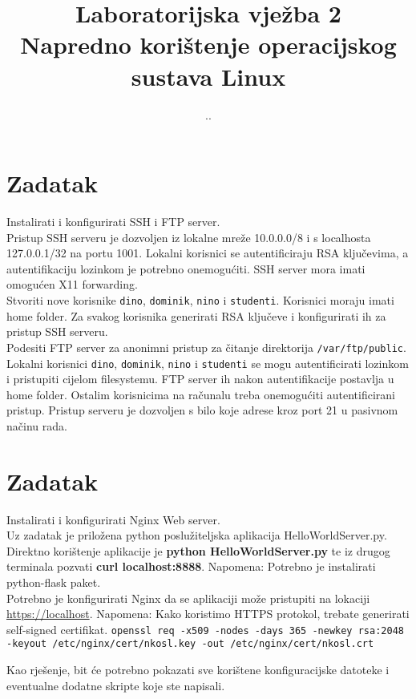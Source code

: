 \documentclass[12pt,a4paper]{article}
\renewcommand{\dateseparator}{.}
\newcommand{\todayiso}{\twodigit\day \dateseparator \twodigit\month \dateseparator \the \year}
\begin{document}
    \title{Laboratorijska vježba 2\\{\large Napredno korištenje operacijskog sustava Linux}}
    \date{\todayiso}
	\date{\vspace{-5ex} }
	\maketitle
	

\section{Zadatak}

Instalirati i konfigurirati SSH i FTP server.\\

Pristup SSH serveru je dozvoljen iz lokalne mreže 10.0.0.0/8 i s localhosta 127.0.0.1/32 na portu 1001. Lokalni korisnici se autentificiraju RSA ključevima, a autentifikaciju lozinkom je potrebno onemogućiti. SSH server mora imati omogućen X11 forwarding.\\
Stvoriti nove korisnike \texttt{dino}, \texttt{dominik}, \texttt{nino} i \texttt{studenti}. Korisnici moraju imati home folder. Za svakog korisnika generirati RSA ključeve i konfigurirati ih za pristup SSH serveru.\\

Podesiti FTP server za anonimni pristup za čitanje direktorija \texttt{/var/ftp/public}. Lokalni korisnici \texttt{dino}, \texttt{dominik}, \texttt{nino} i \texttt{studenti} se mogu autentificirati lozinkom i pristupiti cijelom filesystemu. FTP server ih nakon autentifikacije postavlja u home folder. Ostalim korisnicima na računalu treba onemogućiti autentificirani pristup. Pristup serveru je dozvoljen s bilo koje adrese kroz port 21 u pasivnom načinu rada.\\



\section{Zadatak}

Instalirati i konfigurirati Nginx Web server. \\

Uz zadatak je priložena python poslužiteljska aplikacija HelloWorldServer.py. \\
Direktno korištenje aplikacije je \textbf{python HelloWorldServer.py} te iz drugog terminala pozvati \textbf{curl localhost:8888}.
Napomena: Potrebno je instalirati python-flask paket. \\

Potrebno je konfigurirati Nginx da se aplikaciji može pristupiti na lokaciji \url{https://localhost}. 
Napomena: Kako koristimo HTTPS protokol, trebate generirati self-signed certifikat.
\texttt{openssl req -x509 -nodes -days 365 -newkey rsa:2048 -keyout /etc/nginx/cert/nkosl.key -out /etc/nginx/cert/nkosl.crt}


Kao rješenje, bit će potrebno pokazati sve korištene konfiguracijske datoteke i eventualne dodatne skripte koje ste napisali.
\end{document}
